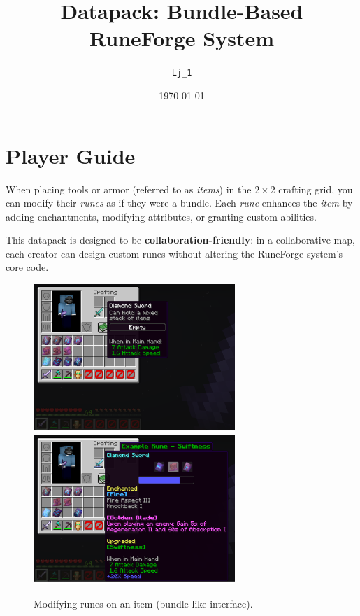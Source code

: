 \documentclass[11pt]{article}
\title{Datapack: Bundle-Based RuneForge System}
\author{\tt Lj\_1}
\date{\today}
\begin{document}
\maketitle
\tableofcontents

\section{Player Guide}

When placing tools or armor (referred to as \textit{items}) in the $2 \times 2$ crafting grid, you can modify their \textit{runes} as if they were a bundle. Each \textit{rune} enhances the \textit{item} by adding enchantments, modifying attributes, or granting custom abilities.

This datapack is designed to be \textbf{collaboration-friendly}: in a collaborative map, each creator can design custom runes without altering the RuneForge system's core code.

\begin{figure}[htbp]
  \centering
  \includegraphics[width=3in]{Screenshot from 2025-04-04 21-44-19.png}
  \includegraphics[width=3in]{Screenshot from 2025-04-04 21-48-46.png}
  \caption{Modifying runes on an item (bundle-like interface).} %
\end{figure}
\end{document}
